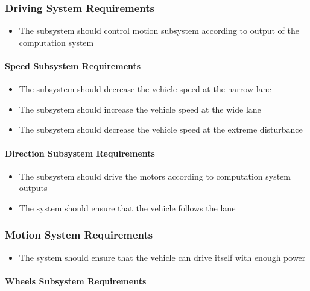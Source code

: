 \documentclass[a4paper,12pt]{article}
\begin{document}
	
	\subsubsection{Driving System Requirements}
	
		\begin{itemize}
			\item The subsystem should control motion subsystem according to output of the computation system
		\end{itemize}
	
	\paragraph{Speed Subsystem Requirements}	
		
		\begin{itemize}
			\item The subsystem should decrease the vehicle speed at the narrow lane 
			\item The subsystem should increase the vehicle speed at the wide lane 
			\item The subsystem should decrease the vehicle speed at the extreme disturbance  
		\end{itemize}
		
	\paragraph{Direction Subsystem Requirements}
	
		\begin{itemize}
			\item The subsystem should drive the motors according to computation system outputs
			\item The system should ensure that the vehicle follows the lane 
		\end{itemize}


	\subsubsection{Motion System Requirements}
	
		\begin{itemize}
			\item The system should	ensure that the vehicle can drive itself with enough power
		\end{itemize}
	
	\paragraph{Wheels Subsystem Requirements}	
		
\end{document}
